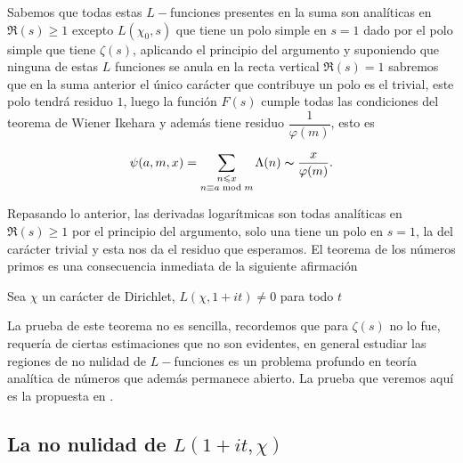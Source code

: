 Sabemos que todas estas $L-$funciones presentes en la suma son analíticas en $\Re(s)\geq 1$ excepto $L(\chi_0,s)$ que tiene un polo simple en $s=1$ dado por el polo simple que tiene $\zeta(s)$, aplicando el principio del argumento y suponiendo que ninguna de estas $L$ funciones se anula en la recta vertical $\Re(s)=1$ sabremos que en la suma anterior el único carácter que contribuye un polo es el trivial, este polo tendrá residuo $1$, luego la función $F(s)$ cumple todas las condiciones del teorema de Wiener Ikehara y además tiene residuo $\dfrac{1}{\varphi(m)}$, esto es

$$\psi(a,m,x)=\sum_{\substack{n\leq x\\n\equiv a\bmod{m}}}\Lambda(n)\thicksim \frac{x}{\varphi(m)}.$$

Repasando lo anterior, las derivadas logarítmicas son todas analíticas en $\Re(s)\geq 1$ por el principio del argumento, solo una tiene un polo en $s=1$, la del carácter trivial y esta nos da el residuo que esperamos. El teorema de los números primos es una consecuencia inmediata de la siguiente afirmación
\begin{theorem}
    Sea $\chi$ un carácter de Dirichlet, $L(\chi,1+it)\neq 0$  para todo $t$
\end{theorem}

La prueba de este teorema no es sencilla, recordemos que para $\zeta(s)$ no lo fue, requería de ciertas estimaciones que no son evidentes, en general estudiar las regiones de no nulidad de $L-$funciones es un problema profundo en teoría analítica de números que además permanece abierto. La prueba que veremos aquí es la propuesta en \cite{murty2007problems}.

\subsection{La no nulidad de \texorpdfstring{$L(1+it,\chi)$ }{Lg}}